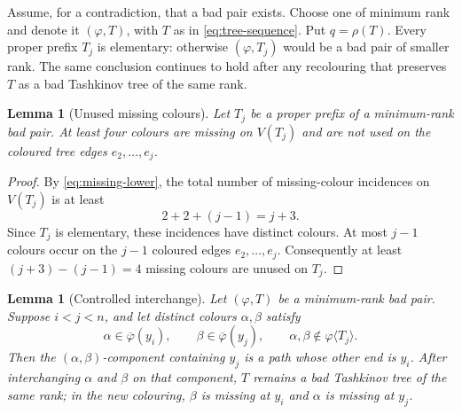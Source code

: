 \documentclass[11pt]{article}
\newtheorem{lemma}[theorem]{Lemma}
\theoremstyle{definition}
\newcommand{\missing}[1]{\overline{#1}}
\newcommand{\phiT}[1]{\varphi\langle #1\rangle}
\begin{document}
Assume, for a contradiction, that a bad pair exists.  Choose one of minimum
rank and denote it $(\varphi,T)$, with $T$ as in \eqref{eq:tree-sequence}.  Put
$q=\rho(T)$.  Every proper prefix $T_j$ is elementary: otherwise
$(\varphi,T_j)$ would be a bad pair of smaller rank.  The same conclusion
continues to hold after any recolouring that preserves $T$ as a bad
Tashkinov tree of the same rank.

\begin{lemma}[Unused missing colours]\label{lem:four-unused}
Let $T_j$ be a proper prefix of a minimum-rank bad pair.  At least four colours
are missing on $V(T_j)$ and are not used on the coloured tree edges
$e_2,\ldots,e_j$.
\end{lemma}

\begin{proof}
By \eqref{eq:missing-lower}, the total number of missing-colour incidences on
$V(T_j)$ is at least
\[
  2+2+(j-1)=j+3.
\]
Since $T_j$ is elementary, these incidences have distinct colours.  At most
$j-1$ colours occur on the $j-1$ coloured edges $e_2,\ldots,e_j$.
Consequently at least $(j+3)-(j-1)=4$ missing colours are unused on $T_j$.
\end{proof}

\begin{lemma}[Controlled interchange]\label{lem:controlled-swap}
Let $(\varphi,T)$ be a minimum-rank bad pair.  Suppose $i<j<n$, and let
distinct colours $\alpha,\beta$ satisfy
\[
  \alpha\in\missing\varphi(y_i),
  \qquad
  \beta\in\missing\varphi(y_j),
  \qquad
  \alpha,\beta\notin\phiT{T_j}.
\]
Then the $(\alpha,\beta)$-component containing $y_j$ is a path whose other end
is $y_i$.  After interchanging $\alpha$ and $\beta$ on that component,
$T$ remains a bad Tashkinov tree of the same rank; in the new colouring,
$\beta$ is missing at $y_i$ and $\alpha$ is missing at $y_j$.
\end{lemma}
\end{document}
